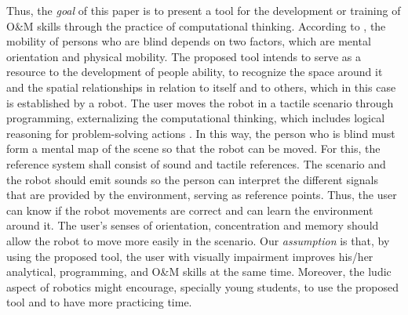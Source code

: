Thus, the \emph{goal} of this paper is to present a tool for the development or training of O\&M skills through the practice of computational thinking. 
According to \cite{figueira2000}, the mobility of persons who are blind depends on two factors, which are mental orientation and physical mobility. The proposed tool intends to serve as a resource to the development of people ability, to recognize the space around it and the spatial relationships in relation to itself and to others, which in this case is established by a robot. The user moves the robot in a tactile scenario through programming, externalizing the computational thinking, which includes logical reasoning for problem-solving actions \cite{zanetti-oliveira2015}. %
In this way, the person who is blind must form a mental map of the scene so that the robot can be moved. For this, the reference system shall consist of sound and tactile references. The scenario and the robot should emit sounds so the person can interpret the different signals that are provided by the environment, serving as reference points. Thus, the user can know if the robot movements are correct and can learn the environment around it. The user's senses of orientation, concentration and memory should allow the robot to move more easily in the scenario.
Our \emph{assumption} is that, by using the proposed tool, the user with visually impairment improves his/her analytical, programming, and O\&M skills at the same time. Moreover, the ludic aspect of robotics might encourage, specially young students, to use the proposed tool and to have more practicing time.

